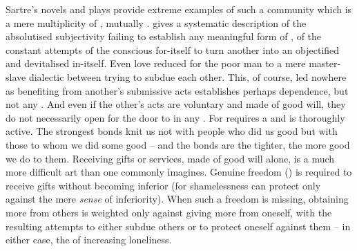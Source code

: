 Sartre's novels and plays provide extreme examples of such a community which is
a mere multiplicity of , mutually .   gives a systematic description of the absolutised subjectivity
failing to establish any meaningful form of , of the constant
attempts of the conscious for-itself to turn another into an objectified and
devitalised in-itself. Even love reduced for the poor man to a mere master-slave
dialectic between  trying to subdue each other.
This, of course, led nowhere as benefiting from another's submissive acts
establishes perhaps dependence, but not any . And even if the
other's acts are voluntary and made of good will, they do not necessarily open
for  the door to  in any . For
 requires a  and is thoroughly active. The
strongest bonds knit us not with people who did us good but with those to whom
we did some good -- and the bonds are the tighter, the more good we do to them.
Receiving gifts or services, made of good will alone, is a much more difficult
art than one commonly imagines. Genuine freedom () is
required to receive gifts without becoming inferior (for shamelessness can
protect only against the mere {\em sense} of inferiority). When
such a freedom is missing, obtaining more from others is weighted only against
giving more from oneself, with the resulting attempts to either subdue others or
to protect oneself against them -- in either case, the  of
increasing loneliness.

